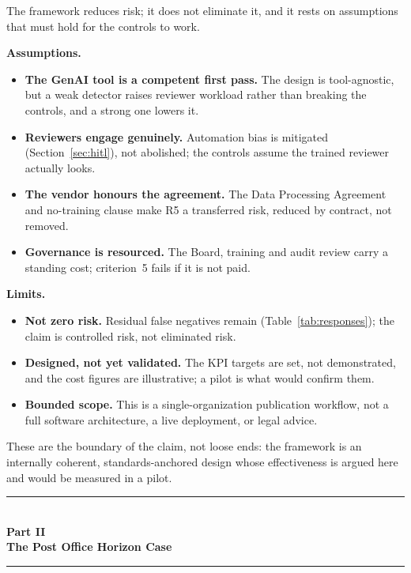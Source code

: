 \documentclass[12pt,a4paper]{article}
\begin{document}
The framework reduces risk; it does not eliminate it, and it rests on assumptions that must hold for the controls to work.

\begin{definitionbox}[]
\textbf{Assumptions.}
\begin{itemize}
  \item \textbf{The GenAI tool is a competent first pass.} The design is tool-agnostic, but a weak detector raises reviewer workload rather than breaking the controls, and a strong one lowers it.
  \item \textbf{Reviewers engage genuinely.} Automation bias is mitigated (Section~\ref{sec:hitl}), not abolished; the controls assume the trained reviewer actually looks.
  \item \textbf{The vendor honours the agreement.} The Data Processing Agreement and no-training clause make R5 a transferred risk, reduced by contract, not removed.
  \item \textbf{Governance is resourced.} The Board, training and audit review carry a standing cost; criterion~5 fails if it is not paid.
\end{itemize}
\textbf{Limits.}
\begin{itemize}
  \item \textbf{Not zero risk.} Residual false negatives remain (Table~\ref{tab:responses}); the claim is controlled risk, not eliminated risk.
  \item \textbf{Designed, not yet validated.} The KPI targets are set, not demonstrated, and the cost figures are illustrative; a pilot is what would confirm them.
  \item \textbf{Bounded scope.} This is a single-organization publication workflow, not a full software architecture, a live deployment, or legal advice.
\end{itemize}
\end{definitionbox}

These are the boundary of the claim, not loose ends: the framework is an internally coherent, standards-anchored design whose effectiveness is argued here and would be measured in a pilot.



\clearpage
\begin{center}
{\color{accentdark}\rule{\textwidth}{1.2pt}}\\[6pt]
{\Huge\bfseries\color{accentdark} Part II}\\[8pt]
{\LARGE\bfseries\color{accentdark!85!black} The Post Office Horizon Case}\\[8pt]
{\color{accentdark}\rule{\textwidth}{1.2pt}}
\end{center}
\vspace{8pt}
\end{document}
